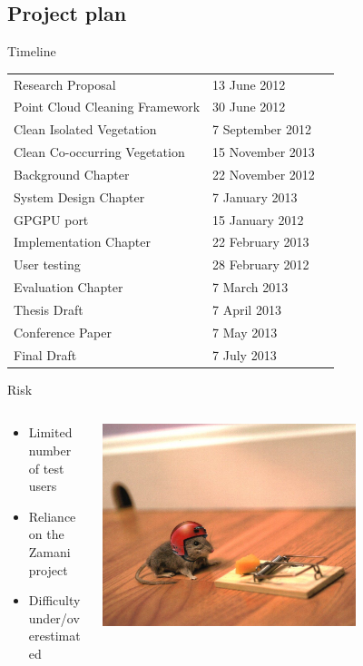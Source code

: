\documentclass[compress]{beamer}
\begin{document}
\subsection{Project plan}
\begin{frame}{Timeline}
\begin{table}[h]
\begin{tabular}{llr}
Research Proposal & 13 June 2012\\
Point Cloud Cleaning Framework & 30 June 2012\\
Clean Isolated Vegetation & 7 September 2012\\
Clean Co-occurring Vegetation & 15 November 2013\\
Background Chapter & 22 November 2012\\
System Design Chapter & 7 January 2013\\
GPGPU port & 15 January 2012\\
Implementation Chapter & 22 February 2013\\
User testing & 28 February 2012\\ %
Evaluation Chapter & 7 March 2013\\
Thesis Draft & 7 April 2013\\
Conference Paper & 7 May 2013\\
Final Draft & 7 July 2013\\
\end{tabular}
\end{table}
\end{frame}

\begin{frame}{Risk}
\begin{columns}[T]
\begin{column}{0.5\textwidth}
	\begin{itemize}
	    \item Limited number of test users
		\item Reliance on the Zamani project
		\item Difficulty under/overestimated
	\end{itemize}
\end{column}
\begin{column}{0.5\textwidth}
\includegraphics[width=0.7\textwidth]{pics/risk2}
\end{column}
\end{columns}
\end{frame}
\end{document}
